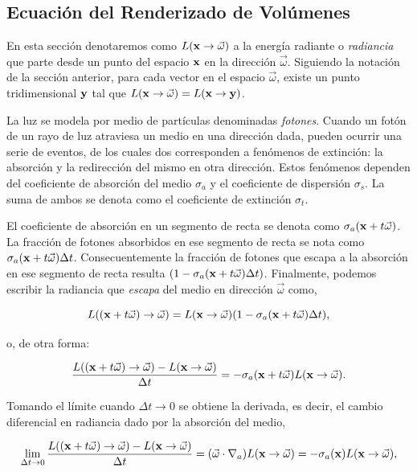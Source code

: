 \subsection{Ecuación del Renderizado de Volúmenes}

En esta sección denotaremos como $L(\bold{x} \rightarrow \vec{\omega})$ a la energía radiante o {\em radiancia} que parte desde un punto del espacio $\bold{x}$ en la dirección $\vec{\omega}$.
Siguiendo la notación de la sección anterior, para cada vector en el espacio $\vec{\omega}$, existe un punto tridimensional $\bold{y}$ tal que $L(\bold{x} \rightarrow \vec{\omega}) = L(\bold{x} \rightarrow \bold{y})$.

La luz se modela por medio de partículas denominadas {\em fotones}. Cuando un fotón de un rayo de luz atraviesa un medio en una dirección dada, pueden ocurrir una serie de eventos, de los cuales dos corresponden a fenómenos de extinción: la absorción y la redirección del mismo en otra dirección.
Estos fenómenos dependen del coeficiente de absorción del medio $\sigma_{a}$ y el coeficiente de dispersión $\sigma_{s}$.
La suma de ambos se denota como el coeficiente de extinción $\sigma_{t}$.

El coeficiente de absorción en un segmento de recta se denota como $\sigma_{a}(\bold{x} + t\vec{\omega})$.
La fracción de fotones absorbidos en ese segmento de recta se nota como $\sigma_{a}(\bold{x} + t\vec{\omega}) \Delta t$.
Consecuentemente la fracción de fotones que escapa a la absorción en ese segmento de recta resulta $(1-\sigma_{a}(\bold{x} + t\vec{\omega}) \Delta t)$.
Finalmente, podemos escribir la radiancia que {\em escapa} del medio en dirección $\vec{\omega}$ como,

$$L((\bold{x}+t\vec{\omega}) \rightarrow \vec{\omega}) = L(\bold{x} \rightarrow \vec{\omega}) (1-\sigma_{a}(\bold{x} + t\vec{\omega}) \Delta t),$$

\noindent o, de otra forma:

$$\frac{L((\bold{x}+t\vec{\omega}) \rightarrow \vec{\omega}) - L(\bold{x} \rightarrow \vec{\omega}) }{ \Delta t } = - \sigma_{a}(\bold{x} + t\vec{\omega}) L(\bold{x} \rightarrow \vec{\omega}).$$

Tomando el límite cuando $\Delta t \rightarrow 0$ se obtiene la derivada, es decir, el cambio diferencial en radiancia dado por la absorción del medio,

$$\lim_{\Delta t \rightarrow 0} \frac{L((\bold{x}+t\vec{\omega}) \rightarrow \vec{\omega}) - L(\bold{x} \rightarrow \vec{\omega}) }{ \Delta t } = (\vec{\omega} \cdot \nabla_{a}) L(\bold{x} \rightarrow \vec{\omega}) = - \sigma_{a}(\bold{x}) L(\bold{x} \rightarrow \vec{\omega}),$$

